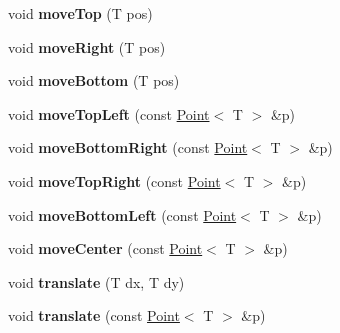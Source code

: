 \begin{DoxyCompactItemize}
\item 
\hypertarget{class_box_a082c2eb93743c2bb2e8d2873a110bdb6}{
void {\bfseries moveTop} (T pos)}
\label{class_box_a082c2eb93743c2bb2e8d2873a110bdb6}

\item 
\hypertarget{class_box_a224e6b7f6da28d3e72d8abac92d0559f}{
void {\bfseries moveRight} (T pos)}
\label{class_box_a224e6b7f6da28d3e72d8abac92d0559f}

\item 
\hypertarget{class_box_a5a5a2ff82018b2b385ed3ad222b081e4}{
void {\bfseries moveBottom} (T pos)}
\label{class_box_a5a5a2ff82018b2b385ed3ad222b081e4}

\item 
\hypertarget{class_box_a25f13cb4c83114b15caa2d62675137bb}{
void {\bfseries moveTopLeft} (const \hyperlink{class_point}{Point}$<$ T $>$ \&p)}
\label{class_box_a25f13cb4c83114b15caa2d62675137bb}

\item 
\hypertarget{class_box_ae5103f2b496ac2f10105c41a336ec088}{
void {\bfseries moveBottomRight} (const \hyperlink{class_point}{Point}$<$ T $>$ \&p)}
\label{class_box_ae5103f2b496ac2f10105c41a336ec088}

\item 
\hypertarget{class_box_a13e447ff3e86e55f6cd66cd74a0d0c7a}{
void {\bfseries moveTopRight} (const \hyperlink{class_point}{Point}$<$ T $>$ \&p)}
\label{class_box_a13e447ff3e86e55f6cd66cd74a0d0c7a}

\item 
\hypertarget{class_box_a365ae8132302f9675d7d962fb7a8faec}{
void {\bfseries moveBottomLeft} (const \hyperlink{class_point}{Point}$<$ T $>$ \&p)}
\label{class_box_a365ae8132302f9675d7d962fb7a8faec}

\item 
\hypertarget{class_box_a62d7d531ad38076276749bcfc20285d2}{
void {\bfseries moveCenter} (const \hyperlink{class_point}{Point}$<$ T $>$ \&p)}
\label{class_box_a62d7d531ad38076276749bcfc20285d2}

\item 
\hypertarget{class_box_a2c3adee7df1462f3bfa5ae4870148505}{
void {\bfseries translate} (T dx, T dy)}
\label{class_box_a2c3adee7df1462f3bfa5ae4870148505}

\item 
\hypertarget{class_box_a077d6debae34fe86b701d7b2f8898c80}{
void {\bfseries translate} (const \hyperlink{class_point}{Point}$<$ T $>$ \&p)}
\label{class_box_a077d6debae34fe86b701d7b2f8898c80}


\end{DoxyCompactItemize}
